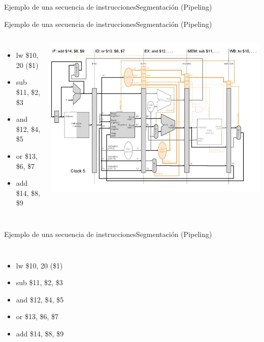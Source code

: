 \documentclass[aspectratio=169,compress]{beamer}
\begin{document}
\begin{footnotesize}
\begin{frame}{Ejemplo de una secuencia de instrucciones}{Segmentación (Pipeling)}
\end{frame}

\begin{frame}{Ejemplo de una secuencia de instrucciones}{Segmentación (Pipeling)}

 \begin{columns}[onlytextwidth,T]
      \column{\dimexpr\linewidth-110mm-5mm}

\bigskip
\begin{itemize}
\item lw \$10, 20 (\$1)
\item sub \$11, \$2, \$3
\item and \$12, \$4, \$5
\item or \$13, \$6, \$7
\item add \$14, \$8, \$9
\end{itemize}

      \column{100mm}
\includegraphics[scale=0.35]{images/pipeling5.jpg} 
    \end{columns}

\end{frame}

\begin{frame}{Ejemplo de una secuencia de instrucciones}{Segmentación (Pipeling)}

 \begin{columns}[onlytextwidth,T]
      \column{\dimexpr\linewidth-110mm-5mm}

\bigskip
\begin{itemize}
\item lw \$10, 20 (\$1)
\item sub \$11, \$2, \$3
\item and \$12, \$4, \$5
\item or \$13, \$6, \$7
\item add \$14, \$8, \$9
\end{itemize}


\end{columns}
\end{frame}
\end{footnotesize}
\end{document}

